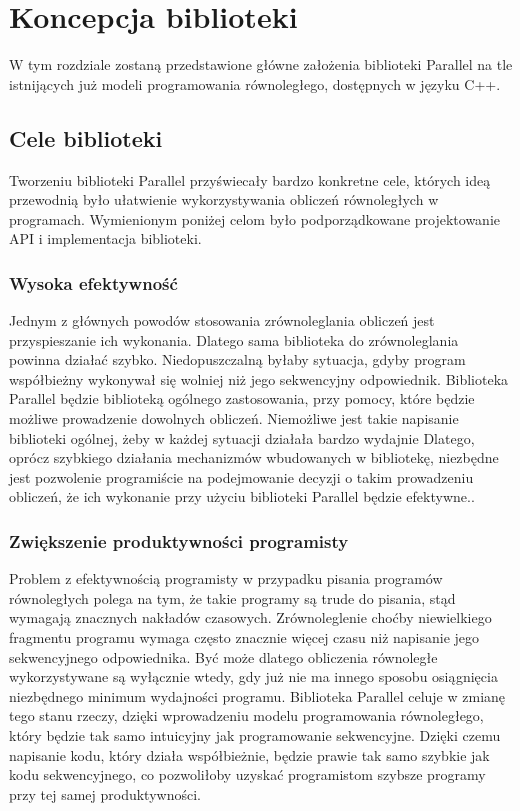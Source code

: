 
\chapter{Koncepcja biblioteki}\label{r:koncepcja}

  W tym rozdziale zostaną przedstawione główne założenia biblioteki Parallel na tle istnijących już modeli programowania równoległego, dostępnych w języku C++.

\section{Cele biblioteki}

  Tworzeniu biblioteki Parallel przyświecały bardzo konkretne cele, których ideą przewodnią było ułatwienie wykorzystywania obliczeń równoległych w programach.
  Wymienionym poniżej celom było podporządkowane projektowanie API i implementacja biblioteki.

\subsection{Wysoka efektywność}

  Jednym z głównych powodów stosowania zrównoleglania obliczeń jest przyspieszanie ich wykonania. Dlatego sama biblioteka do zrównoleglania powinna działać szybko.
  Niedopuszczalną byłaby sytuacja, gdyby program współbieżny wykonywał się wolniej niż jego sekwencyjny odpowiednik.
  Biblioteka Parallel będzie biblioteką ogólnego zastosowania, przy pomocy, które będzie możliwe prowadzenie dowolnych obliczeń.
  Niemożliwe jest takie napisanie biblioteki ogólnej, żeby w każdej sytuacji działała bardzo wydajnie
  Dlatego, oprócz szybkiego działania mechanizmów wbudowanych w bibliotekę, niezbędne jest pozwolenie programiście na podejmowanie decyzji o takim prowadzeniu obliczeń, że ich wykonanie przy użyciu biblioteki Parallel będzie efektywne..
  
\subsection{Zwiększenie produktywności programisty}
  Problem z efektywnością programisty w przypadku pisania programów równoległych polega na tym, że takie programy są trude do pisania, stąd wymagają znacznych nakładów czasowych.
  Zrównoleglenie choćby niewielkiego fragmentu programu wymaga często znacznie więcej czasu niż napisanie jego sekwencyjnego odpowiednika.
  Być może dlatego obliczenia równoległe wykorzystywane są wyłącznie wtedy, gdy już nie ma innego sposobu osiągnięcia niezbędnego minimum wydajności programu.
  Biblioteka Parallel celuje w zmianę tego stanu rzeczy, dzięki wprowadzeniu modelu programowania równoległego, który będzie tak samo intuicyjny jak programowanie sekwencyjne.
  Dzięki czemu napisanie kodu, który działa współbieżnie, będzie prawie tak samo szybkie jak kodu sekwencyjnego, co pozwoliłoby uzyskać programistom szybsze programy przy tej samej produktywności.

